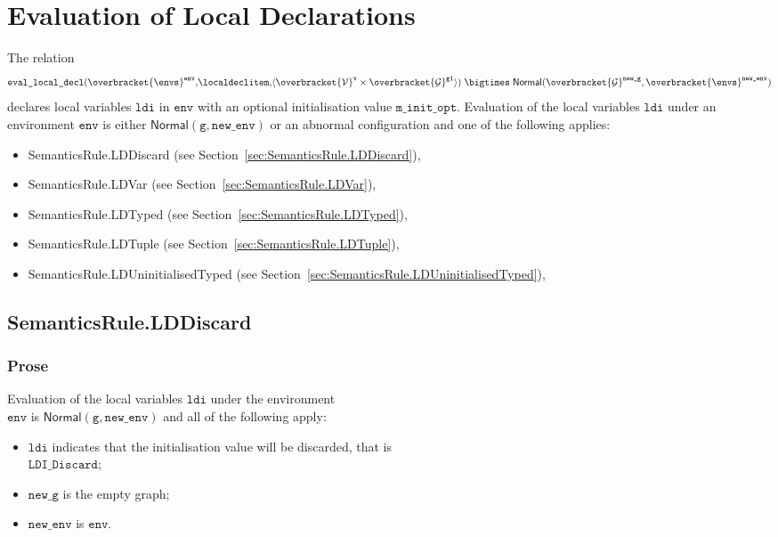 \documentclass{book}
\newcommand\secref[1]{Section~\ref{sec:#1}}
\newcommand\overname[2]{\overbracket{#1}^{#2}}
\newcommand\XGraphs[0]{\mathcal{G}}
\newcommand\vals[0]{\mathcal{V}}
\newcommand\aslrel[0]{\bigtimes}
\newcommand\aslsep[0]{\mathbf{,}}
\newcommand\evallocaldecl[1]{\texttt{eval\_local\_decl}(#1)}
\newcommand\Normal[0]{\textsf{Normal}}
\newcommand\newenv[0]{\texttt{new\_env}}
\newcommand\env[0]{\texttt{env}}
\newcommand\vg[0]{\texttt{g}}
\newcommand\newg[0]{\texttt{new\_g}}
\newcommand\vv[0]{\texttt{v}}
\newcommand\vgone[0]{\texttt{g1}}
\newcommand\ldi[0]{\texttt{ldi}}
\newcommand\minitopt[0]{\texttt{m\_init\_opt}}
\begin{document}

\chapter{Evaluation of Local Declarations \label{chap:eval_local_decl}}

The relation
\[
  \evallocaldecl{\overname{\envs}{\env} \aslsep \localdeclitem \aslsep \langle\overname{\vals}{\vv}\times\overname{\XGraphs}{\vgone}\rangle} \;\aslrel\;
                         \Normal(\overname{\XGraphs}{\newg}, \overname{\envs}{\newenv})
\]
declares local variables
$\ldi$ in $\env$ with an optional initialisation value
$\minitopt$.  Evaluation of the local variables $\ldi$
under an environment $\env$ is either $\Normal(\vg, \newenv)$
or an abnormal configuration and one of the following applies:
\begin{itemize}
  \item SemanticsRule.LDDiscard (see \secref{SemanticsRule.LDDiscard}),
  \item SemanticsRule.LDVar (see \secref{SemanticsRule.LDVar}),
  \item SemanticsRule.LDTyped (see \secref{SemanticsRule.LDTyped}),
  \item SemanticsRule.LDTuple (see \secref{SemanticsRule.LDTuple}),
  \item SemanticsRule.LDUninitialisedTyped (see \secref{SemanticsRule.LDUninitialisedTyped}),
\end{itemize}

\section{SemanticsRule.LDDiscard \label{sec:SemanticsRule.LDDiscard}}
    \subsection{Prose}
    Evaluation of the local variables $\ldi$ under the environment \\
    $\env$ is $\Normal(\vg, \newenv)$ and all of the following apply:
    \begin{itemize}
    \item $\ldi$ indicates that the initialisation value will be discarded,
    that is \\ $\texttt{LDI\_Discard}$;
    \item $\newg$ is the empty graph;
    \item $\newenv$ is $\env$.
    \end{itemize}
\end{document}
